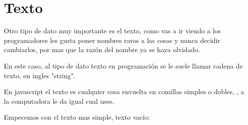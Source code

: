 \documentclass[letterpaper,10pt,spanish]{sphinxmanual}
\begin{document}
%
\begin{sphinxVerbatim}[commandchars=\\\{\}]
\end{sphinxVerbatim}

%
\begin{sphinxVerbatim}[commandchars=\\\{\}]
 
\end{sphinxVerbatim}

%
\begin{sphinxVerbatim}[commandchars=\\\{\}]
\end{sphinxVerbatim}

%
\begin{sphinxVerbatim}[commandchars=\\\{\}]
 
\end{sphinxVerbatim}


\section{Texto}
\label{\detokenize{datos-con-javascript:texto}}
Otro tipo de dato muy importante es el texto, como vas a ir viendo a los
programadores les gusta poner nombres raros a las cosas y nunca decidir
cambiarlos, por mas que la razón del nombre ya se haya olvidado.

En este caso, al tipo de dato texto en programación se le suele llamar cadena
de texto, en ingles "string".

En javascript el texto es cualquier cosa envuelta en comillas simples  o
dobles, , a la computadora le da igual cual uses.

Empecemos con el texto mas simple, texto vacío:

%
\begin{sphinxVerbatim}[commandchars=\\\{\}]
\end{sphinxVerbatim}

%
\begin{sphinxVerbatim}[commandchars=\\\{\}]
 
\end{sphinxVerbatim}
\end{document}
